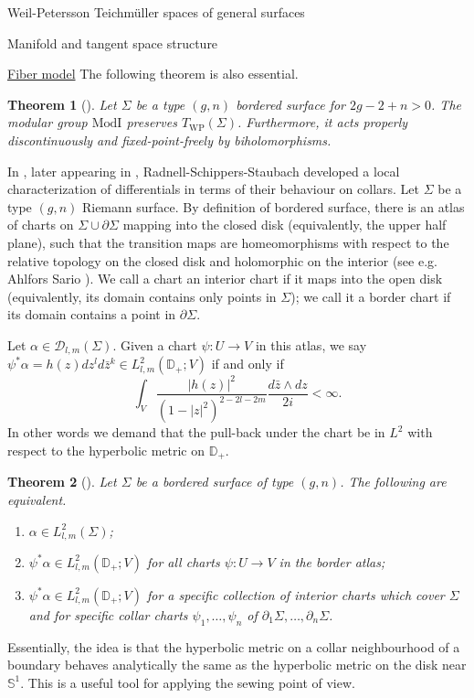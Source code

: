 \documentclass[12pt]{amsart}
\newcommand{\disk}{\ensuremath{\mathbb{D}} } %
\newcommand{\riem}{\Sigma}  %
\theoremstyle{plain}
\newtheorem{theorem}{Theorem}[section]
\theoremstyle{definition}
\theoremstyle{remark}
\numberwithin{equation}{section} %
\numberwithin{figure}{section} %
\begin{document}
\begin{section}{Weil-Petersson Teichm\"uller spaces of general surfaces}
\begin{subsection}{Manifold and tangent space structure}
\begin{subsubsection}{{\underline{Fiber model}}}
The following theorem is also essential.
\begin{theorem}[\cite{RSS_Filbert2}]
  Let $\riem$ be a type $(g,n)$ bordered surface for $2g-2+n>0$. The modular group $\mathrm{ModI}$ preserves $T_{\mathrm{WP}}(\riem)$. Furthermore, it acts properly discontinuously and fixed-point-freely by biholomorphisms.  
\end{theorem}


In \cite{RSS_WP_arxiv}, later appearing in \cite{RSS_WP1}, Radnell-Schippers-Staubach developed a local characterization of differentials in terms of their behaviour on collars. Let $\riem$ be a type $(g,n)$ Riemann surface. By definition of bordered surface, there is an atlas of charts on $\riem \cup \partial \riem$ mapping into the closed disk (equivalently, the upper half plane), such that the transition maps are homeomorphisms with respect to the relative topology on the closed disk and holomorphic on the interior (see e.g. Ahlfors Sario \cite{Ahlfors_Sario}).  We call a chart an interior chart if it maps into the open disk (equivalently, its domain contains only points in $\riem$); we call it a border chart if its domain contains a point in $\partial \riem$. 

Let $\alpha \in \mathscr{D}_{l,m}(\riem)$. Given a chart $\psi:U \rightarrow V$ in this atlas, we say $\psi^* \alpha = h(z) dz^l d\bar{z}^k \in L^2_{l,m}(\disk_+;V)$ if and only if 
\[   \int_V \frac{|h(z)|^2}{(1-|z|^2)^{2-2l-2m}} \frac{d\bar{z} \wedge dz}{2i} <\infty.   \]
In other words we demand that the pull-back under the chart be in $L^2$ with respect to the hyperbolic metric on $\disk_+$.  

\begin{theorem}[\cite{RSS_WP1}] 
 Let $\riem$ be a bordered surface of type $(g,n)$. The following are equivalent.
 \begin{enumerate}[font=\upshape]
  \item $\alpha \in L^2_{l,m}(\riem)$;
  \item $\psi^*\alpha \in L^2_{l,m}(\disk_+;V)$ for all charts $\psi:U \rightarrow V$ in the border atlas;
  \item $\psi^*\alpha \in L^2_{l,m}(\disk_+;V)$ for a specific collection of interior charts which cover $\riem$ and for specific collar charts $\psi_1,\ldots,\psi_n$ of $\partial_1 \riem,\ldots,\partial_n \riem$. 
 \end{enumerate}
\end{theorem} 
Essentially, the idea is that the hyperbolic metric on a collar neighbourhood of a boundary behaves analytically the same as the hyperbolic metric on the disk near $\mathbb{S}^1$. This is a useful tool for applying the sewing point of view. 
 


\end{subsubsection}
\end{subsection}
\end{section}
\end{document}
